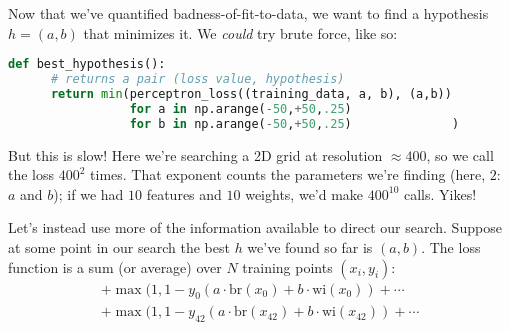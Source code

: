 
  Now that we've quantified badness-of-fit-to-data, we want to find a
  hypothesis $h=(a,b)$ that minimizes it.
  We
  \emph{could} try brute force, like so:
  \begin{lstlisting}[language=Python, basicstyle=\footnotesize\ttfamily]
    def best_hypothesis():
      # returns a pair (loss value, hypothesis)
      return min(perceptron_loss((training_data, a, b), (a,b))
                 for a in np.arange(-50,+50,.25)
                 for b in np.arange(-50,+50,.25)              )
  \end{lstlisting}
  But this is slow!  Here we're searching a 2D grid at resolution $\approx
  400$, so we call the loss $400^2$ times.  That exponent counts the parameters
  we're finding (here, $2$: $a$ and $b$); if we had $10$ features and $10$
  weights, we'd make $400^{10}$ calls.  Yikes!

  Let's instead use more of the information available to direct our search.
  Suppose at some point in our search the best $h$ we've found so far is
  $(a, b)$.  The loss function is a sum (or average) over $N$
  training points $(x_i, y_i)$:
  \begin{align*}
      +\max(1,1-{y_{0}}  (a \cdot {\text{br}(x_{0})} + b \cdot{\text{wi}(x_{0})})+\cdots
    \\+\max(1,1-{y_{42}} (a \cdot {\text{br}(x_{42})} + b \cdot{\text{wi}(x_{42})})+\cdots
  \end{align*}

